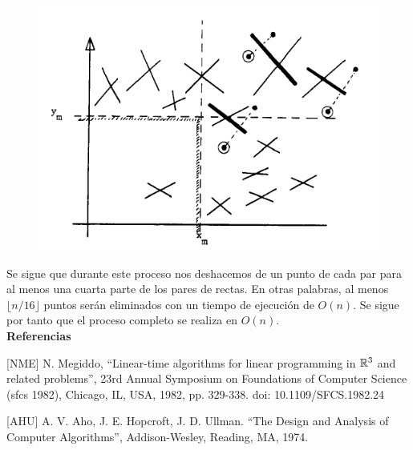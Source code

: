 \documentclass[twoside]{article}
\begin{document}
\begin{solucion}
  \begin{figure}[h!]
  \centering
  \includegraphics[scale=0.7]{Fig5}
  \caption{}\label{Fig5}
  \end{figure}
  
  Se sigue que durante este proceso nos deshacemos de un punto de cada par para al menos una cuarta parte de los pares de rectas. En otras palabras, al menos $\lfloor n/16\rfloor$ puntos serán eliminados con un tiempo de ejecución de $O(n)$. Se sigue por tanto que el proceso completo se realiza en $O(n)$. \\
 
 \textbf{Referencias}
 
[NME] N. Megiddo, ``Linear-time algorithms for linear programming in $\mathbb{R}^3$ and related problems'', 23rd Annual Symposium on Foundations of Computer Science (sfcs 1982), Chicago, IL, USA, 1982, pp. 329-338.
doi: 10.1109/SFCS.1982.24

[AHU] A. V. Aho, J. E. Hopcroft, J. D. Ullman. ``The Design and Analysis of Computer Algorithms'', Addison-Wesley, Reading, MA, 1974. 
\end{solucion}
\end{document}
